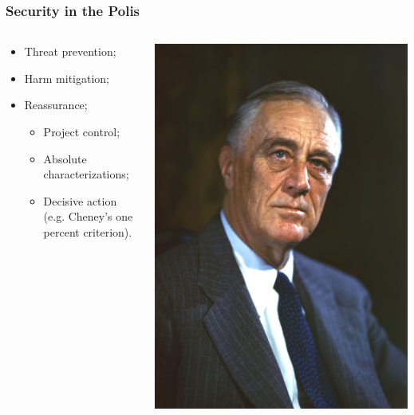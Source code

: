\documentclass[aspectratio=169]{beamer}
\theoremstyle{principle}
\begin{document}
\begin{frame}
\frametitle{Security in the Polis}
\begin{columns}
\begin{column}{0.5\textwidth}

\begin{itemize}
\item Threat prevention;
\bigskip
\bigskip
\bigskip
\item Harm mitigation;
\bigskip
\bigskip
\bigskip
\item Reassurance;
\begin{itemize}
\item Project control;
\item Absolute characterizations;
\item Decisive action (e.g. Cheney's one percent criterion).
\end{itemize}
\end{itemize}
\end{column}
\begin{column}{0.5\textwidth}
\includegraphics[scale=0.05]{FDR.jpg}
\end{column}
\end{columns}

\end{frame}
\end{document}
